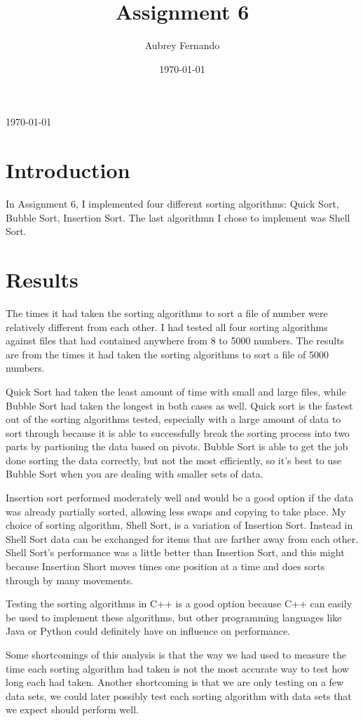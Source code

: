 \documentclass[12pt,notitlepage]{IEEEtran}
\begin{document}
\title{Assignment 6}
\author{Aubrey Fernando}
\date{\today}
 
\maketitle

\setlength{\parindent}{10ex}
\today
\section{Introduction}
In Assignment 6, I implemented four different sorting algorithms: Quick Sort, Bubble Sort, Insertion Sort. 
The last algorithmn I chose to implement was Shell Sort. 
\\
\section{Results}
The times it had taken the sorting algorithms to sort a file of number were relatively different from each other. 
I had tested all four sorting algorithms against files that had contained anywhere from 8 to 5000 numbers. The results are from
the times it had taken the sorting algorithms to sort a file of 5000 numbers. \\ \par 
Quick Sort had taken the least amount of time with small and large files, while Bubble Sort had taken the longest in both cases as well. Quick sort is the fastest out of the sorting algorithms tested, especially with a large amount of data to sort through because it is able to successfully break the sorting process into two parts by partioning the data based on pivots. 
Bubble Sort is able to get the job done sorting the data correctly, but not the most efficiently, so it's best to use Bubble Sort when you are dealing with smaller sets of data. \\ \par
Insertion sort performed moderately well and would be a good option if the data was already partially sorted, allowing less swaps and copying to take place. My choice of sorting algorithm, Shell Sort, is a variation of Insertion Sort. Instead in Shell Sort data can be exchanged for items that are farther away from each other. Shell Sort's performance was a little better than Insertion Sort, and this might because Insertion Short moves times one position at a time and does sorts through by many movements. \\ \par
Testing the sorting algorithms in C++ is a good option because C++ can easily be used to implement these algorithms, but other programming languages like Java or Python could definitely have on influence on performance. \\ \par
Some shortcomings of this analysis is that the way we had used to measure the time each sorting algorithm had taken is not the most accurate way to test how long each had taken. Another shortcoming is that we are only testing on a few data sets, we could later possibly test each sorting algorithm with data sets that we expect should perform well.\\  \par
\end{document}
